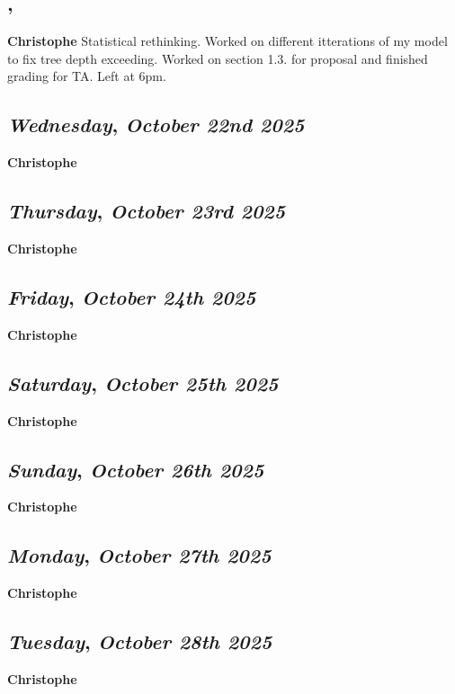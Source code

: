 \subsection*{\weekday, \day}
\textbf {Christophe}
Statistical rethinking. Worked on different itterations of my model to fix tree depth exceeding. Worked on section 1.3. for proposal and finished grading for TA. Left at 6pm.

\def\day{\textit{October 22nd 2025}}
\def\weekday{\textit{Wednesday}}
\subsection*{\weekday, \day}
\textbf {Christophe}

\def\day{\textit{October 23rd 2025}}
\def\weekday{\textit{Thursday}}
\subsection*{\weekday, \day}
\textbf {Christophe}

\def\day{\textit{October 24th 2025}}
\def\weekday{\textit{Friday}}
\subsection*{\weekday, \day}
\textbf {Christophe}

\def\day{\textit{October 25th 2025}}
\def\weekday{\textit{Saturday}}
\subsection*{\weekday, \day}
\textbf {Christophe}

\def\day{\textit{October 26th 2025}}
\def\weekday{\textit{Sunday}}
\subsection*{\weekday, \day}
\textbf {Christophe}

\def\day{\textit{October 27th 2025}}
\def\weekday{\textit{Monday}}
\subsection*{\weekday, \day}
\textbf {Christophe}

\def\day{\textit{October 28th 2025}}
\def\weekday{\textit{Tuesday}}
\subsection*{\weekday, \day}
\textbf {Christophe}

